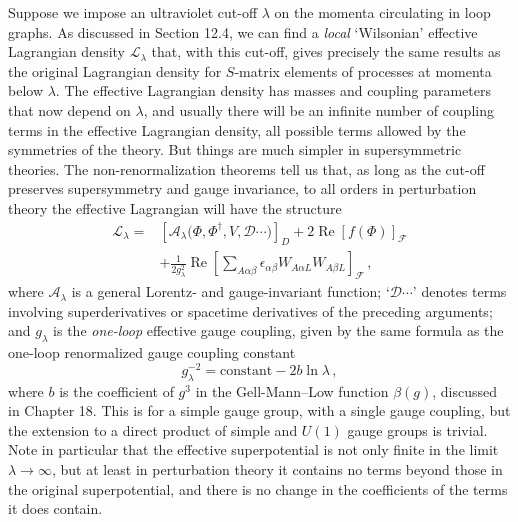 Suppose we impose an ultraviolet cut-off \(\lambda\) on the momenta
circulating in loop graphs. As discussed in Section 12.4, we can find a
\emph{local} `Wilsonian' effective Lagrangian density \(\mathcal{L}_\lambda\)
that, with this cut-off, gives precisely the same results as the original
Lagrangian density for \(S\)-matrix elements of processes at momenta below
\(\lambda\). The effective Lagrangian density has masses and coupling
parameters that now depend on \(\lambda\), and usually there will be an
infinite number of coupling terms in the effective Lagrangian density, all
possible terms allowed by the symmetries of the theory. But things are much
simpler in supersymmetric theories. The non-renormalization theorems tell us
that, as long as the cut-off preserves supersymmetry and gauge invariance, to
all orders in perturbation theory the effective Lagrangian will have the
structure
\begin{equation}
  \begin{aligned}
  \mathcal{L}_\lambda
  ={}&
  \left[
    \mathcal{A}_\lambda
    \bigl(\Phi,\Phi^\dagger,V,\mathcal{D}\cdots\bigr)
  \right]_D
  +2\operatorname{Re}\left[f(\Phi)\right]_{\mathcal{F}}
  \\
  &+\frac{1}{2g_\lambda^2}\operatorname{Re}
  \left[
    \sum_{A\alpha\beta}
    \epsilon_{\alpha\beta}W_{A\alpha L}W_{A\beta L}
  \right]_{\mathcal{F}}\,,
  \end{aligned}
  \tag{27.6.2}\label{eq:27.6.2}
\end{equation}
where \(\mathcal{A}_\lambda\) is a general Lorentz- and gauge-invariant
function; `\(\mathcal{D}\cdots\)' denotes terms involving superderivatives or
spacetime derivatives of the preceding arguments; and \(g_\lambda\) is the
\emph{one-loop} effective gauge coupling, given by the same formula as the
one-loop renormalized gauge coupling constant
\begin{equation}
  g_\lambda^{-2}=\text{constant}-2b\ln\lambda\,,
  \tag{27.6.3}\label{eq:27.6.3}
\end{equation}
where \(b\) is the coefficient of \(g^3\) in the Gell-Mann--Low function
\(\beta(g)\), discussed in Chapter 18. This is for a simple gauge group, with
a single gauge coupling, but the extension to a direct product of simple and
\(U(1)\) gauge groups is trivial. Note in particular that the effective
superpotential is not only finite in the limit \(\lambda\longrightarrow
\infty\), but at least in perturbation theory it contains no terms beyond
those in the original superpotential, and there is no change in the
coefficients of the terms it does contain.

